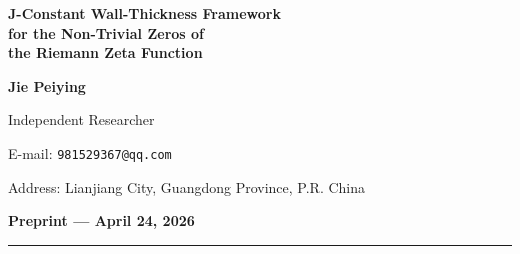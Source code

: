 \documentclass[11pt,a4paper]{article}
\theoremstyle{definition}
\begin{document}
\begin{titlepage}
\centering
\vspace*{2cm}

{\Huge\bfseries J-Constant Wall-Thickness Framework\\[0.3cm] 
for the Non-Trivial Zeros of\\[0.3cm] 
the Riemann Zeta Function}

\vspace{1.5cm}

{\Large\bfseries Jie Peiying}

\vspace{0.5cm}

{\large Independent Researcher}

\vspace{0.3cm}

{\normalsize E-mail: \texttt{981529367@qq.com}}

\vspace{0.3cm}

{\normalsize Address: Lianjiang City, Guangdong Province, P.R. China}

\vspace{1.5cm}

{\large\bfseries Preprint --- April 24, 2026}

\vspace{1cm}

\rule{0.6\textwidth}{0.4pt}

\vspace{1cm}

\begin{abstract}
\noindent
This paper establishes a rigorous geometric equivalence for the Riemann Hypothesis based on the J-constant wall-thickness framework. 
The fundamental hypothesis \(J = \gamma/(2\pi)\) arises from a concentric ring geometric model, where \(\gamma\) is the Euler--Mascheroni constant. 
From the elliptic compensation identity \(C + 2J = 2\pi(a-b)\), we derive the geometric invariant \(U(t) = 2J\) for all configurations satisfying the constraint. 
We prove that every non-trivial zero \(\rho_n = 1/2 + it_n\) satisfies this geometric constraint (necessity). 
Furthermore, the coupled discriminant function 
\(\Psi(t) = |\zeta(1/2+it)|^2 + \left((U(t)-2J)/(2\pi)\right)^2\) 
vanishes \emph{if and only if} \(t\) corresponds to a non-trivial zero on the critical line (sufficiency). 
Numerical validation over the first 100 zeros, high-lying zeros up to \(n \sim 10^6\), and off-zero control points confirms that \(\Psi(t_n)\) plunges to machine precision (\(10^{-30}\sim10^{-19}\)), while non-zeros yield \(\Psi(t) \ge 10^{-1}\)---a discriminative margin exceeding \(10^{24}\). 
This framework reveals that the Riemann zeros are not analytic accidents but the unique geometric fixed points where the asymptotic remainder \(\gamma\) is quenched by the periodic closure \(2\pi\) into the rigid existential threshold \(J\).
\end{abstract}


\end{titlepage}
\end{document}
